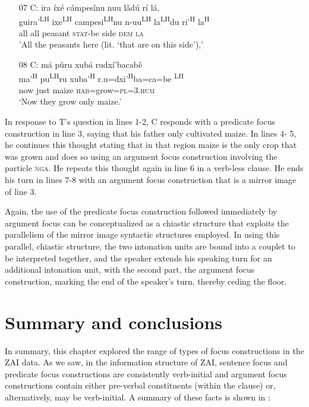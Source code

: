 \begin{itemize}
\item[07 C:] 
\glll ira \'{i}x\'{e} c\'{a}mpes\v{i}nu nuu l\v{a}d\'{u} r\'{i} l\'{a}, \\
guira'\textsuperscript{LH} ixe\textsuperscript{LH} campesi\textsuperscript{LH}nu n-uu\textsuperscript{LH} la\textsuperscript{LH}du ri'\textsuperscript{H}  la\textsuperscript{H} \\
all all peasant \textsc{stat}-be side \textsc{dem} \textsc{la} \\
\glt 'All the peasants here (lit. `that are on this side'),'


\item[08 C:]
\glll m\'{a} p\v{u}ru xub\'{a} rudx\'{i}'bacab\v{e}  \\        
ma'\textsuperscript{H} pu\textsuperscript{LH}ru xuba'\textsuperscript{H} r.u=dxi'\textsuperscript{H}ba=ca=be \textsuperscript{LH}  \\
now just maize \textsc{hab}=grow=\textsc{pl=3.hum}  \\
\glt `Now they grow only maize.' 

\end{itemize}
\z

In response to T's question in lines 1-2, C responds with a predicate focus construction in line 3, saying that his father only cultivated maize. In lines 4- 5, he continues this thought stating that in that region maize is the only crop that was grown and does so using an argument focus construction involving the particle \textsc{nga}. He repeats this thought again in line 6 in a verb-less clause. He ends his turn in lines 7-8 with an argument focus construction that is a mirror image of line 3. 

Again, the use of the predicate focus construction followed immediately by argument focus can be conceptualized as a chiastic structure that exploits the parallelism of the mirror image syntactic structures employed. In using this parallel, chiastic structure, the two intonation units are bound into a couplet to be interpreted together, and the speaker extends his speaking turn for an additional intonation unit, with the second part, the argument focus construction, marking the end of the speaker's turn, thereby ceding the floor.


\section{Summary and conclusions}


In summary, this chapter explored the range of types of focus constructions in the ZAI data. As we saw, in the information structure of ZAI, sentence focus and predicate focus constructions are consistently verb-initial and argument focus constructions contain either pre-verbal constituents (within the clause) or, alternatively, may be verb-initial. A summary of these facts is shown in :


